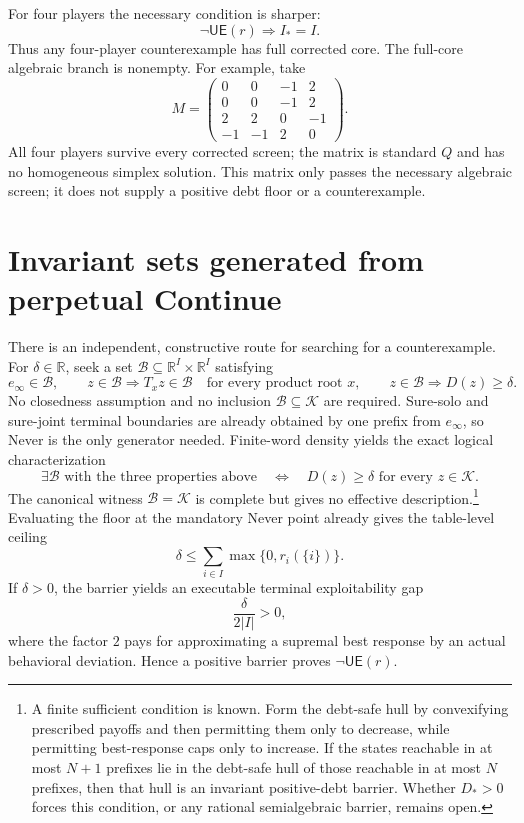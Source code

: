 \documentclass[11pt]{article}
\newcommand{\R}{\mathbb R}
\newcommand{\K}{\mathcal K}
\newcommand{\UE}{\mathsf{UE}}
\begin{document}
For four players the necessary condition is sharper:
\begin{equation}
\label{eq:four-full-core}
 \boxed{\neg\UE(r)\Longrightarrow I_*=I.}
\end{equation}
Thus any four-player counterexample has full corrected core.  The full-core
algebraic branch is nonempty.  For example, take
\[
 M=\begin{pmatrix}
 0&0&-1&2\\
 0&0&-1&2\\
 2&2&0&-1\\
 -1&-1&2&0
 \end{pmatrix}.
\]
All four players survive every corrected screen; the matrix is standard $Q$
and has no homogeneous simplex solution.  This matrix only passes the
necessary algebraic screen; it does not supply a positive debt floor or a
counterexample.

\section{Invariant sets generated from perpetual Continue}
\label{sec:barriers}

There is an independent, constructive route for searching for a
counterexample.  For $\delta\in\R$, seek a set
$\mathcal B\subseteq\R^I\times\R^I$ satisfying
\[
 e_\infty\in\mathcal B,
 \qquad z\in\mathcal B\Longrightarrow T_xz\in\mathcal B
       \quad\text{for every product root }x,
 \qquad z\in\mathcal B\Longrightarrow D(z)\ge\delta.
\]
No closedness assumption and no inclusion $\mathcal B\subseteq\K$ are required.
Sure-solo and sure-joint terminal boundaries are already obtained by one
prefix from $e_\infty$, so Never is the only generator needed.  Finite-word
density yields the exact logical characterization
\begin{equation}
\label{eq:barrier-characterization}
 \boxed{
 \exists\mathcal B\text{ with the three properties above}
 \quad\Longleftrightarrow\quad
 D(z)\ge\delta\text{ for every }z\in\K.}
\end{equation}
The canonical witness $\mathcal B=\K$ is complete but gives no effective
description.\footnote{A finite sufficient condition is known.  Form the
debt-safe hull by convexifying prescribed payoffs and then permitting them
only to decrease, while permitting best-response caps only to increase.  If
the states reachable in at most $N+1$ prefixes lie in the debt-safe hull of
those reachable in at most $N$ prefixes, then that hull is an invariant
positive-debt barrier.  Whether $D_*>0$ forces this condition, or any rational
semialgebraic barrier, remains open.}  Evaluating the floor at the mandatory Never point
already gives the table-level ceiling
\[
 \delta\le \sum_{i\in I}\max\{0,r_i(\{i\})\}.
\]
If $\delta>0$, the barrier yields an executable
terminal exploitability gap
\[
 \frac{\delta}{2|I|}>0,
\]
where the factor $2$ pays for approximating a supremal best response by an
actual behavioral deviation.  Hence a positive barrier proves
$\neg\UE(r)$.
\end{document}
